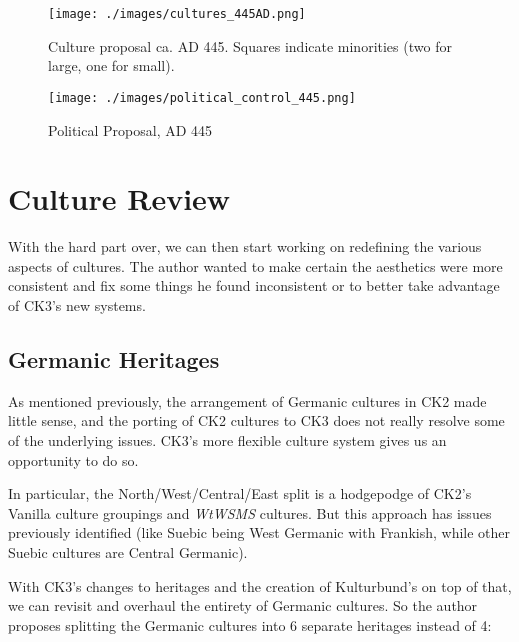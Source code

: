\documentclass{article}
\begin{document}
	\newpage
	
	\begin{figure}[h!]
		\centering
		\texttt{[image: ./images/cultures\_445AD.png]}
		\caption{Culture proposal ca. AD 445. Squares indicate minorities (two for large, one for small).}
	\end{figure}
	
	\begin{figure}[h!]
		\centering
		\texttt{[image: ./images/political\_control\_445.png]}
		\caption{Political Proposal, AD 445}
	\end{figure}
	
	\newpage
	
	\section{Culture Review}
	\label{sec:culture_review}
	
	With the hard part over, we can then start working on redefining the various aspects of cultures.
	The author wanted to make certain the aesthetics were more consistent and fix some things he found inconsistent or to better take advantage of CK3's new systems.
	
	\subsection{Germanic Heritages}
	\label{sec:culture_review:subsec:germanic_heritages}
	As mentioned previously, the arrangement of Germanic cultures in CK2 made little sense, and the porting of CK2 cultures to CK3 does not really resolve some of the underlying issues.
	CK3's more flexible culture system gives us an opportunity to do so.
	
	In particular, the North/West/Central/East split is a hodgepodge of CK2's Vanilla culture groupings and \textit{WtWSMS} cultures.
	But this approach has issues previously identified (like Suebic being West Germanic with Frankish, while other Suebic cultures are Central Germanic).
	
	With CK3's changes to heritages and the creation of Kulturbund's on top of that, we can revisit and overhaul the entirety of Germanic cultures.
	So the author proposes splitting the Germanic cultures into 6 separate heritages instead of 4:
	
\end{document}
